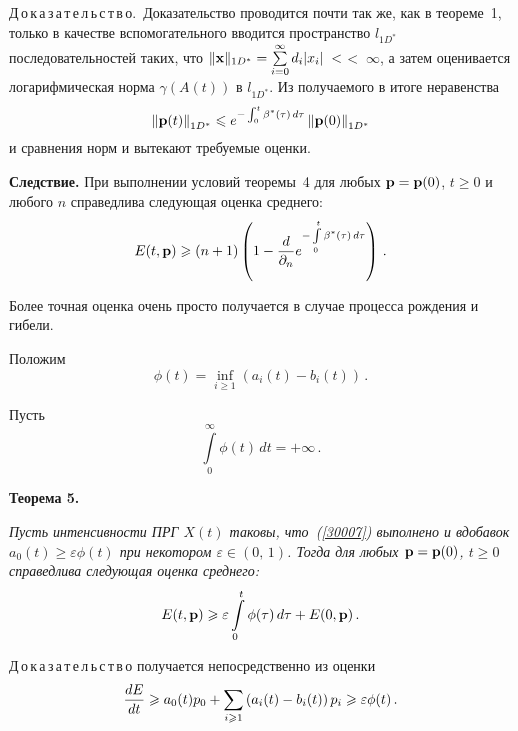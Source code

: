 \begin{multicols}{2}
\medskip

\noindent
Д\,о\,к\,а\,з\,а\,т\,е\,л\,ь\,с\,т\,в\,о.~Доказательство проводится почти так же, как в
теореме~1, только в качестве вспомогательного вводится пространство
$l_{1D^*}$  последовательностей таких, что   $\|{\bf
x}\|_{1D^*}=\sum\limits_{i=0}^{\infty}d_{i}|x_{i}|\;<$\linebreak $<\;\infty$, а затем
оценивается логарифмическая норма $\gamma \left(A(t)\right)$ в
$l_{1D^*}$. Из получаемого в итоге неравенства
\begin{equation*}
\left\|{\bf p}(t)\right\|_{1D^*} \le  e^{-\int_0^t  \beta^* (\tau)\,
d\tau}\left\|{\bf p}(0)\right\|_{1D^*} 
\end{equation*}
и сравнения норм и вытекают требуемые оценки.

\bigskip

\noindent
{\bf Следствие.} При выполнении условий теоремы~4 для любых ${\bf
p}= {\bf p}(0)$, $t \ge 0$ и любого $n$ справедлива следующая
оценка среднего:
\begin{equation*}
 E(t,{\bf p}) \ge
 \left(n+1\right)\left(1-\fr{d}{{\partial}_n }e^{-\int\limits_0^t  \beta^* (\tau)\,
d\tau} \right)\,. 
\end{equation*}

\bigskip
Более точная оценка очень просто получается в случае процесса
рождения и гибели.

Положим
\begin{equation*}
\phi (t) = \inf_{ i \ge 1} \left(a_i(t) - b_i(t)\right)\,.
\end{equation*}

Пусть
\begin{equation}
\int\limits_0^{\infty} \phi (t)\, dt = +\infty \,. 
\label{30007}
\end{equation}

\bigskip

\noindent
{\bf Теорема 5.} {\it  Пусть интенсивности ПРГ  $X(t)$ таковы, что~(\ref{30007}) 
выполнено и вдобавок $a_0(t) \ge \varepsilon \phi
(t)$ при некотором $\varepsilon \in (0,\,1)$. Тогда для любых ${\bf
p}= {\bf p}(0)$, $t \ge 0$  справедлива следующая оценка среднего:
\begin{equation}
 E(t,{\bf p}) \ge
 \varepsilon \int\limits_0^t   \phi (\tau)\,
d\tau  +  E(0,{\bf p})\,. 
\label{30008}
\end{equation}

}

Д\,о\,к\,а\,з\,а\,т\,е\,л\,ь\,с\,т\,в\,о получается непосредственно из оценки
\begin{equation*}
\fr{dE}{dt} \ge a_0(t)p_0 + \sum\limits_{i \ge 1} \left(a_i(t) - b_i(t)\right)
p_i \ge  \varepsilon \phi (t)\,. 
\end{equation*}


\end{multicols}

